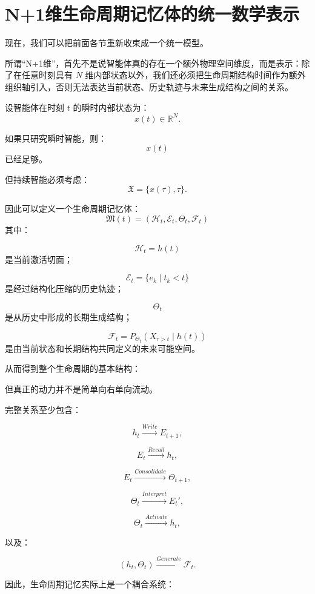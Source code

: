 \section{N+1维生命周期记忆体的统一数学表示}

现在，我们可以把前面各节重新收束成一个统一模型。

所谓“N+1维”，首先不是说智能体真的存在一个额外物理空间维度，而是表示：除了在任意时刻具有 \(N\) 维内部状态以外，我们还必须把生命周期结构时间作为额外组织轴引入，否则无法表达当前状态、历史轨迹与未来生成结构之间的关系。

设智能体在时刻 \(t\) 的瞬时内部状态为：
\[
x(t)\in\mathbb R^N.
\]

如果只研究瞬时智能，则：
\[
x(t)
\]
已经足够。

但持续智能必须考虑：
\[
\mathfrak X
=
\{
x(\tau),\tau
\}.
\]

因此可以定义一个生命周期记忆体：
\[
\boxed{
\mathfrak M(t)
=
\left(
\mathcal H_t,
\mathcal E_t,
\Theta_t,
\mathcal F_t
\right)
}
\]
其中：

\[
\mathcal H_t
=
h(t)
\]
是当前激活切面；

\[
\mathcal E_t
=
\{e_k\mid t_k<t\}
\]
是经过结构化压缩的历史轨迹；

\[
\Theta_t
\]
是从历史中形成的长期生成结构；

\[
\mathcal F_t
=
P_{\Theta_t}
(
X_{\tau>t}\mid h(t)
)
\]
是由当前状态和长期结构共同定义的未来可能空间。

从而得到整个生命周期的基本结构：

\begin{statementbox}
\centering
{}
\end{statementbox}

但真正的动力并不是简单向右单向流动。

完整关系至少包含：

\[
h_t
\xrightarrow{Write}
E_{t+1},
\]

\[
E_t
\xrightarrow{Recall}
h_t,
\]

\[
E_t
\xrightarrow{Consolidate}
\Theta_{t+1},
\]

\[
\Theta_t
\xrightarrow{Interpret}
E_t',
\]

\[
\Theta_t
\xrightarrow{Activate}
h_t,
\]

以及：

\[
(h_t,\Theta_t)
\xrightarrow{Generate}
\mathcal F_t.
\]

因此，生命周期记忆实际上是一个耦合系统：

